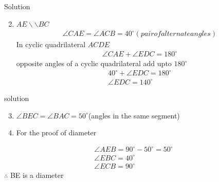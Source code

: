 \documentclass{beamer}
\begin{document}
     \begin{frame}{Solution}
     \begin{enumerate}
     \setcounter{enumi}{1}
          \item $AE \backslash\backslash BC$
    \begin{align}
     \angle CAE=\angle ACB=40^{\circ}(pair of alternate angles)
     \end{align}
     In cyclic quadrilateral $ACDE$
     \begin{align}
         \angle CAE + \angle EDC=180^{\circ}
     \end{align}
      opposite angles of a cyclic quadrilateral add upto $180^{\circ}$ \\
      \begin{align}
        40^{\circ}+\angle EDC=180^{\circ}\\
        \angle EDC =140^{\circ}
      \end{align}
            \end{enumerate}
            \end{frame}
            
        \begin{frame}{solution}
        
        
        \begin{enumerate}
            \setcounter{enumi}{2}
        
        \item $\angle BEC= \angle BAC=50^{\circ}$(angles in the same segment)
      \item For the proof of diameter
      \end{enumerate}
      \begin{align}
      \angle AEB=90^{\circ}-50^{\circ}=50^{\circ}\\
      \angle EBC=40^{\circ}\\
      \angle ECB=90^{\circ}
            \end{align}
$\therefore$ BE is a diameter
        \end{frame}
        
\end{document}

